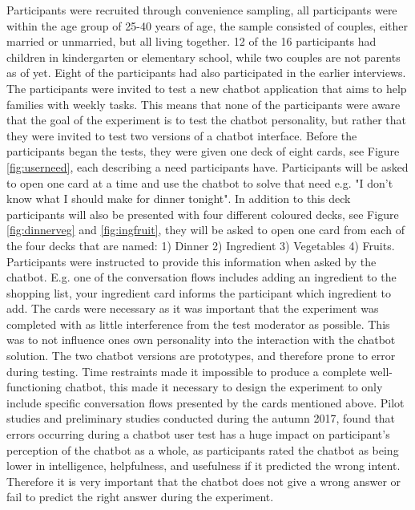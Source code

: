     Participants were recruited through convenience sampling, all participants were within the age group of 25-40 years of age, the sample consisted of couples, either married or unmarried, but all living together. 12 of the 16 participants had children in kindergarten or elementary school, while two couples are not parents as of yet. Eight of the participants had also participated in the earlier interviews. The participants were invited to test a new chatbot application that aims to help families with weekly tasks. This means that none of the participants were aware that the goal of the experiment is to test the chatbot personality, but rather that they were invited to test two versions of a chatbot interface. Before the participants began the tests, they were given one deck of eight cards, see Figure \ref{fig:userneed}, each describing a need participants have. Participants will be asked to open one card at a time and use the chatbot to solve that need e.g. "I don't know what I should make for dinner tonight". In addition to this deck participants will also be presented with four different coloured decks, see Figure \ref{fig:dinnerveg} and \ref{fig:ingfruit}, they will be asked to open one card from each of the four decks that are named: 1) Dinner 2) Ingredient 3) Vegetables 4) Fruits. Participants were instructed to provide this information when asked by the chatbot. E.g. one of the conversation flows includes adding an ingredient to the shopping list, your ingredient card informs the participant which ingredient to add. The cards were necessary as it was important that the experiment was completed with as little interference from the test moderator as possible. This was to not influence ones own personality into the interaction with the chatbot solution. The two chatbot versions are prototypes, and therefore prone to error during testing. Time restraints made it impossible to produce a complete well-functioning chatbot, this made it necessary to design the experiment to only include specific conversation flows presented by the cards mentioned above. Pilot studies and preliminary studies conducted during the autumn 2017, found that errors occurring during a chatbot user test has a huge impact on participant's perception of the chatbot as a whole, as participants rated the chatbot as being lower in intelligence, helpfulness, and usefulness if it predicted the wrong intent. Therefore it is very important that the chatbot does not give a wrong answer or fail to predict the right answer during the experiment. 
   
